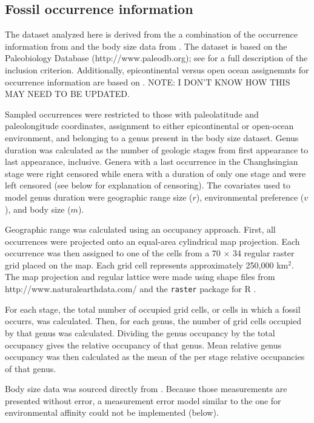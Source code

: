 \documentclass[12pt,letterpaper]{article}
\begin{document}
\subsection{Fossil occurrence information}

The dataset analyzed here is derived from the a combination of the occurrence information from \citet{Foote2013} and the body size data from \citet{Payne2014}. The \citet{Foote2013} dataset is based on the Paleobiology Database (http://www.paleodb.org); see \citet{Foote2013} for a full description of the inclusion criterion. Additionally, epicontinental versus open ocean assignemnts for occurrence information are based on \citet{Miller2009a}. \uppercase{note: I don't know how this may need to be updated.}

Sampled occurrences were restricted to those with paleolatitude and paleolongitude coordinates, assignment to either epicontinental or open-ocean environment, and belonging to a genus present in the body size dataset. Genus duration was calculated as the number of geologic stages from first appearance to last appearance, inclusive. Genera with a last occurrence in the Changhsingian stage were right censored while enera with a duration of only one stage and were left censored (see below for explanation of censoring). The covariates used to model genus duration were geographic range size (\(r\)), environmental preference (\(v\)), and body size (\(m\)). 

Geographic range was calculated using an occupancy approach. First, all occurrences were projected onto an equal-area cylindrical map projection. Each occurrence was then assigned to one of the cells from a 70 \(\times\) 34 regular raster grid placed on the map. Each grid cell represents approximately 250,000 km\(^{2}\). The map projection and regular lattice were made using shape files from http://www.naturalearthdata.com/ and the \texttt{raster} package for R \citep{raster}.

For each stage, the total number of occupied grid cells, or cells in which a fossil occurrs, was calculated. Then, for each genus, the number of grid cells occupied by that genus was calculated. Dividing the genus occupancy by the total occupancy gives the relative occupancy of that genus. Mean relative genus occupancy was then calculated as the mean of the per stage relative occupancies of that genus. 

Body size data was sourced directly from \citet{Payne2014}. Because those measurements are presented without error, a measurement error model similar to the one for environmental affinity could not be implemented (below).
\end{document}
